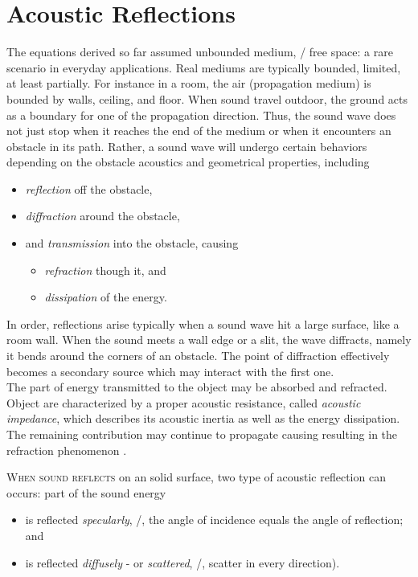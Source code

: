 \section{Acoustic Reflections}\label{ch:acoustics:sec:reflection}
The equations derived so far assumed unbounded medium, \ie/ free space: a rare scenario in everyday applications.
Real mediums are typically bounded, limited, at least partially.
For instance in a room, the air (propagation medium) is bounded by walls, ceiling, and floor.
When sound travel outdoor, the ground acts as a boundary for one of the propagation direction.
Thus, the sound wave does not just stop when it reaches the end of the medium or when it encounters an obstacle in its path.
Rather, a sound wave will undergo certain behaviors depending on the obstacle acoustics and geometrical properties, including
\begin{itemize}
    \item \textit{reflection} off the obstacle,
    \item \textit{diffraction} around the obstacle,
    \item and \textit{transmission} into the obstacle, causing
    \begin{itemize}
        \item \textit{refraction} though it, and
        \item \textit{dissipation} of the energy.
    \end{itemize}
\end{itemize}

In order, reflections arise typically when a sound wave hit a large surface, like a room wall.
When the sound meets a wall edge or a slit, the wave diffracts, namely it bends around the corners of an obstacle.
The point of diffraction effectively becomes a secondary source which may interact with the first one.
\\The part of energy transmitted to the object may be absorbed and refracted.
Object are characterized by a proper acoustic resistance, called \textit{acoustic impedance}, which
describes its acoustic inertia as well as the energy dissipation.
The remaining contribution may continue to propagate causing resulting in the refraction phenomenon .

\textsc{When sound reflects} on an solid surface, two type of acoustic reflection can occurs: part of the sound energy
\begin{itemize}
    \item is reflected \textit{specularly}, \ie/, the angle of incidence equals the angle of reflection; and
    \item is reflected \textit{diffusely} - or \textit{scattered}, \ie/, scatter in every direction).
\end{itemize}

